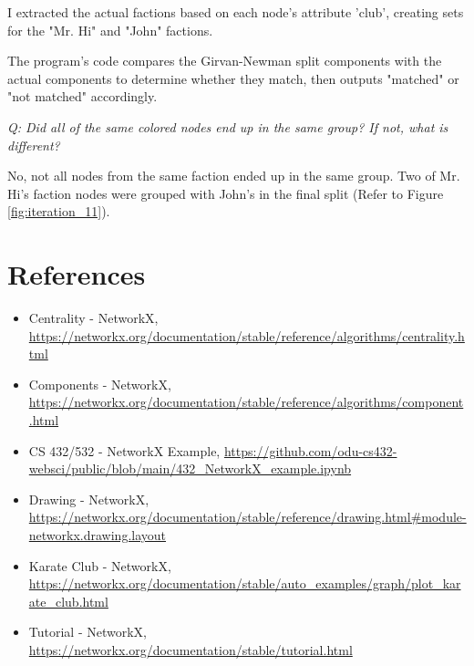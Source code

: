 \documentclass[12pt]{article}
\begin{document}
I extracted the actual factions based on each node's attribute 'club', creating sets for the "Mr. Hi" and "John" factions.

The program's code compares the Girvan-Newman split components with the actual components to determine whether they match, then outputs "matched" or "not matched" accordingly.

\emph{Q: Did all of the same colored nodes end up in the same group? If not, what is different?}

No, not all nodes from the same faction ended up in the same group. Two of Mr. Hi's faction nodes were grouped with John's in the final split (Refer to Figure \ref{fig:iteration_11}). 


\clearpage

\section*{References}

\begin{itemize}
    \item {Centrality - NetworkX, \url{https://networkx.org/documentation/stable/reference/algorithms/centrality.html}}
    \item {Components - NetworkX, \url{https://networkx.org/documentation/stable/reference/algorithms/component.html}}
    \item{CS 432/532 - NetworkX Example, \url{https://github.com/odu-cs432-websci/public/blob/main/432_NetworkX_example.ipynb}}
    \item {Drawing - NetworkX, \url{https://networkx.org/documentation/stable/reference/drawing.html#module-networkx.drawing.layout}}
    \item {Karate Club - NetworkX, \url{https://networkx.org/documentation/stable/auto_examples/graph/plot_karate_club.html}}
    \item{Tutorial - NetworkX, \url{https://networkx.org/documentation/stable/tutorial.html}}
\end{itemize}
\end{document}
